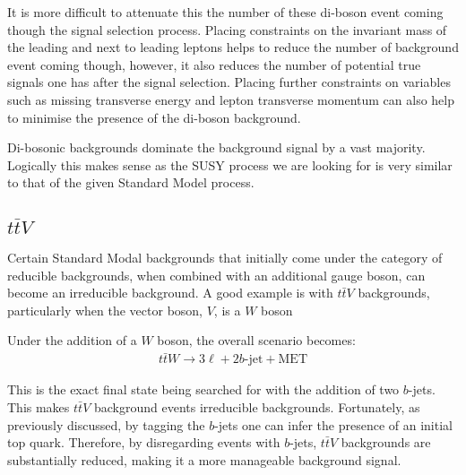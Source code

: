 \noindent It is more difficult to attenuate this the number of these di-boson event coming though the signal selection process.
Placing constraints on the invariant mass  of the leading and next to leading leptons helps to reduce the number of background event coming though, however, it also reduces the number of potential true signals one has after the signal selection.
Placing further constraints on variables such as missing transverse energy and lepton transverse momentum can also help to minimise the presence of the di-boson background.

Di-bosonic backgrounds dominate the background signal by a vast majority.
Logically this makes sense as the SUSY process we are looking for is very similar to that of the given Standard Model process. 

\subsection{$t\bar{t}V$}
Certain Standard Modal backgrounds that initially come under the category of reducible backgrounds, when combined with an additional gauge boson, can become an irreducible background. 
A good example is with $t\bar{t}V$ backgrounds, particularly when the vector boson, $V$, is a $W$ boson

Under the addition of a $W$ boson, the overall scenario becomes:
\begin{align}
t\bar{t}W \rightarrow 3\ell + 2b\textrm{-jet} + \textrm{MET}
\end{align}

\noindent This is the exact final state being searched for with the addition of two $b$-jets. 
This makes $t\bar{t}V$ background events irreducible backgrounds.
Fortunately, as previously discussed, by tagging the $b$-jets one can infer the presence of an initial top quark.
Therefore, by disregarding events with $b$-jets, $t\bar{t}V$ backgrounds are substantially reduced, making it a more manageable background signal.